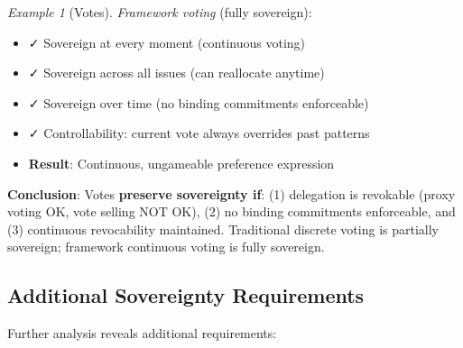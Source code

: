 \documentclass[11pt,a4paper]{article}
\theoremstyle{definition}
\theoremstyle{remark}
\newtheorem{example}[theorem]{Example}
\begin{document}
\begin{example}[Votes]
\textit{Framework voting} (fully sovereign):
\begin{itemize}
\item ✓ Sovereign at every moment (continuous voting)
\item ✓ Sovereign across all issues (can reallocate anytime)
\item ✓ Sovereign over time (no binding commitments enforceable)
\item ✓ Controllability: current vote always overrides past patterns
\item \textbf{Result}: Continuous, ungameable preference expression
\end{itemize}

\textbf{Conclusion}: Votes \textbf{preserve sovereignty if}: (1) delegation is revokable (proxy voting OK, vote selling NOT OK), (2) no binding commitments enforceable, and (3) continuous revocability maintained. Traditional discrete voting is partially sovereign; framework continuous voting is fully sovereign.
\end{example}

\subsection{Additional Sovereignty Requirements}

Further analysis reveals additional requirements:
\end{document}
